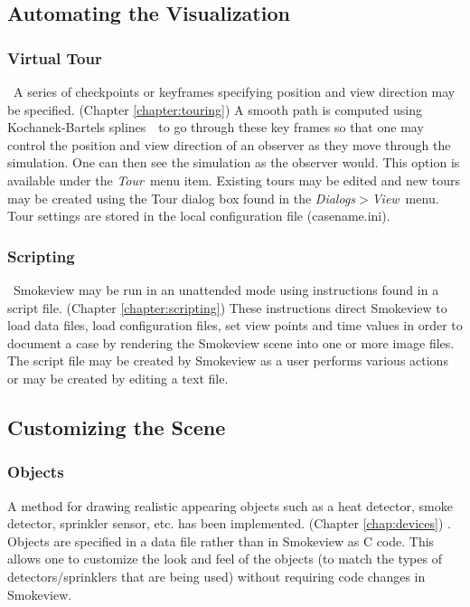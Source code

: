 \documentclass[11pt,twoside]{book}
\begin{document}
\subsection{Automating the Visualization}
\subsubsection{Virtual Tour}\   A series of checkpoints or keyframes
specifying position and view direction may be specified. (Chapter
\ref{chapter:touring}) A smooth path is computed using
Kochanek-Bartels splines~\cite{moller:02}\ to go through these key
frames so that one may control the position and view direction of
an observer as they move through the simulation. One can then see
the simulation as the observer would. This option is available
under the {\em Tour}\ menu item. Existing tours may be edited and
new tours may be created using the Tour dialog box found in
the {\em Dialogs$>$View}\ menu. Tour settings are stored in the local
configuration file (casename.ini).

\subsubsection{Scripting}\ Smokeview may be run in an unattended mode using
instructions found in a script file. (Chapter
\ref{chapter:scripting}) These instructions direct Smokeview to
load data files, load configuration files, set view points and
time values in order to document a case by rendering the Smokeview
scene into one or more image files. The script file may be created
by Smokeview as a user performs various actions or may be created
by editing a text file.

\subsection{Customizing the Scene}

\subsubsection{Objects}A method for drawing realistic appearing objects such as a heat detector,
smoke detector, sprinkler sensor, etc. has been implemented.
(Chapter \ref{chap:devices}) . Objects are specified in a data
file rather than in Smokeview as C code. This allows one to
customize the look and feel of the objects (to match the types of
detectors/sprinklers that are being used) without requiring code
changes in Smokeview.
\end{document}
